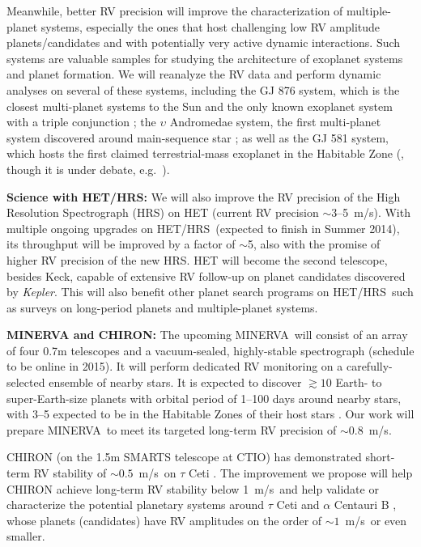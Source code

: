 \documentclass[12pt]{article}
\def\mps{m/s}
\def\kepler{{\it Kepler}}
\def\minerva{MINERVA}
\def\hrs{HET/HRS}
\begin{document}
Meanwhile, better RV precision will improve the characterization of
multiple-planet systems, especially the ones that host challenging low
RV amplitude planets/candidates and with potentially very active
dynamic interactions. Such systems are valuable samples for studying
the architecture of exoplanet systems and planet formation. We will
reanalyze the RV data and perform dynamic analyses on several of these
systems, including the GJ 876 system, which is the closest
multi-planet systems to the Sun and the only known exoplanet system
with a triple conjunction \citep{marcy2001,rivera2005,rivera2010}; the
$\upsilon$ Andromedae system, the first multi-planet system discovered
around main-sequence star \citep{butler1999,wright2009,curiel2011}; as
well as the GJ 581 system, which hosts the first claimed
terrestrial-mass exoplanet in the Habitable Zone (\citealt{vogt2010},
though it is under debate,
e.g.~\citealt{gregory2011,vogt2012,robertson2013}).

\textbf{Science with \hrs: } We will also improve the RV precision of
the High Resolution Spectrograph (HRS) on HET (current RV precision
$\sim$3--5~\mps). With multiple ongoing upgrades on \hrs\ (expected to
finish in Summer 2014), its throughput will be improved by a factor of
$\sim$5, also with the promise of higher RV precision of the new
HRS. HET will become the second telescope, besides Keck, capable of
extensive RV follow-up on planet candidates discovered by
\kepler. This will also benefit other planet search programs on
\hrs\ such as surveys on long-period planets and multiple-planet
systems.

\textbf{MINERVA and CHIRON: } The upcoming \minerva\ will consist of
an array of four 0.7m telescopes and a vacuum-sealed, highly-stable
spectrograph (schedule to be online in 2015). It will perform
dedicated RV monitoring on a carefully-selected ensemble of nearby
stars. It is expected to discover $\gtrsim 10$ Earth- to
super-Earth-size planets with orbital period of 1--100 days around
nearby stars, with 3--5 expected to be in the Habitable Zones of their
host stars \citep{bottom2013,hogstrom2013}. Our work will prepare
\minerva\ to meet its targeted long-term RV precision of $\sim
0.8$~\mps.

CHIRON (on the 1.5m SMARTS telescope at CTIO) has demonstrated
short-term RV stability of $\sim0.5$~\mps\ on $\tau$ Ceti
\citep{chiron2013}. The improvement we propose will help CHIRON
achieve long-term RV stability below 1~\mps\ and help validate or
characterize the potential planetary systems around $\tau$ Ceti
\citep{tuomi2013} and $\alpha$ Centauri B
\citep{dumusque2012,hatzes2013}, whose planets (candidates) have RV
amplitudes on the order of $\sim 1$~\mps\ or even smaller.
\end{document}
